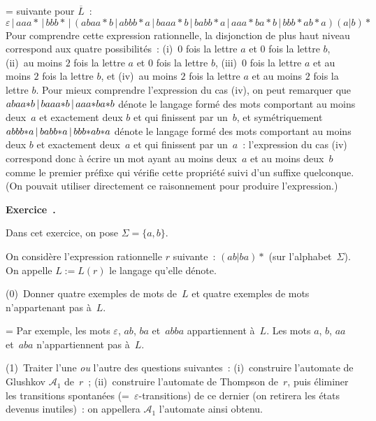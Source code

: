 \documentclass[12pt,a4paper]{article}
\theoremstyle{definition}
\newcommand\exercice{%
\refstepcounter{comcnt}\bigskip\noindent\textbf{Exercice~\thecomcnt.}}
\newif\ifcorrige
\newenvironment{corrige}%
{\ifcorrige\relax\else\setbox0=\vbox\bgroup\fi%
\smallbreak\footnotesize\noindent{\underbar{\textit{Corrigé.}}\quad}}
{{\hbox{}\nobreak\hfill\checkmark}%
\ifcorrige\relax\else\egroup\fi\par}
\begin{document}
\begin{corrige}
suivante pour $\overline{L}$ :
\[
\varepsilon\,|\,aaa{*}\,|\,bbb{*}\,|\,(abaa{*}b \,|\,
abbb{*}a \,|\, baaa{*}b \,|\, babb{*}a
\,|\, aaa{*}ba{*}b \,|\, bbb{*}ab{*}a)(a|b){*}
\]
Pour comprendre cette expression rationnelle, la disjonction de plus
haut niveau correspond aux quatre possibilités : (i) $0$ fois la
lettre $a$ et $0$ fois la lettre $b$, (ii) au moins $2$ fois la lettre
$a$ et $0$ fois la lettre $b$, (iii) $0$ fois la lettre $a$ et au
moins $2$ fois la lettre $b$, et (iv) au moins $2$ fois la lettre $a$
et au moins $2$ fois la lettre $b$.  Pour mieux comprendre
l'expression du cas (iv), on peut remarquer que $abaa{*}b
\penalty0\,|\, baaa{*}b \penalty0\,|\, aaa{*}ba{*}b$ dénote le langage
formé des mots comportant au moins deux $a$ et exactement deux $b$ et
qui finissent par un $b$, et symétriquement $abbb{*}a \penalty0\,|\,
babb{*}a \penalty0\,|\,bbb{*}ab{*}a$ dénote le langage formé des mots
comportant au moins deux $b$ et exactement deux $a$ et qui finissent
par un $a$ : l'expression du cas (iv) correspond donc à écrire un mot
ayant au moins deux $a$ et au moins deux $b$ comme le premier préfixe
qui vérifie cette propriété suivi d'un suffixe quelconque.  (On
pouvait utiliser directement ce raisonnement pour produire
l'expression.)
\end{corrige}

%

\exercice

Dans cet exercice, on pose $\Sigma = \{a,b\}$.

On considère l'expression rationnelle $r$ suivante : $(ab|ba){*}$ (sur
l'alphabet $\Sigma$).  On appelle $L := L(r)$ le langage qu'elle
dénote.

(0) Donner quatre exemples de mots de $L$ et quatre exemples de mots
n'appartenant pas à $L$.

\begin{corrige}
Par exemple, les mots $\varepsilon$, $ab$, $ba$ et $abba$
appartiennent à $L$.  Les mots $a$, $b$, $aa$ et $aba$ n'appartiennent
pas à $L$.
\end{corrige}

(1) Traiter l'une \emph{ou} l'autre des questions suivantes :
(i) construire l'automate de Glushkov $\mathscr{A}_1$ de $r$ ;
(ii) construire l'automate de Thompson de $r$, puis éliminer les
transitions spontanées (= $\varepsilon$-transitions) de ce dernier (on
retirera les états devenus inutiles) : on appellera $\mathscr{A}_1$
l'automate ainsi obtenu.
\end{document}

